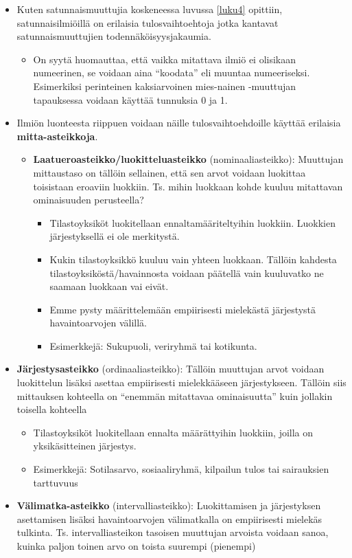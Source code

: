\documentclass[
]{book}
\providecommand{\tightlist}{%
  \setlength{\itemsep}{0pt}\setlength{\parskip}{0pt}}
\begin{document}
\begin{itemize}
\item
  Kuten satunnaismuuttujia koskeneessa luvussa \ref{luku4} opittiin, satunnaisilmiöillä on erilaisia tulosvaihtoehtoja jotka kantavat satunnaismuuttujien todennäköisyysjakaumia.

  \begin{itemize}
  \tightlist
  \item
    On syytä huomauttaa, että vaikka mitattava ilmiö ei olisikaan numeerinen, se voidaan aina ``koodata'' eli muuntaa numeeriseksi. Esimerkiksi perinteinen kaksiarvoinen mies-nainen -muuttujan tapauksessa voidaan käyttää tunnuksia 0 ja 1.
  \end{itemize}
\item
  Ilmiön luonteesta riippuen voidaan näille tulosvaihtoehdoille käyttää erilaisia \textbf{mitta-asteikkoja}.

  \begin{itemize}
  \tightlist
  \item
    \textbf{Laatueroasteikko/luokitteluasteikko} (nominaaliasteikko): Muuttujan mittaustaso on tällöin sellainen, että sen arvot voidaan luokittaa toisistaan eroaviin luokkiin. Ts. mihin luokkaan kohde kuuluu mitattavan ominaisuuden perusteella?

    \begin{itemize}
    \tightlist
    \item
      Tilastoyksiköt luokitellaan ennaltamääriteltyihin luokkiin. Luokkien järjestyksellä ei ole merkitystä.
    \item
      Kukin tilastoyksikkö kuuluu vain yhteen luokkaan. Tällöin kahdesta tilastoyksiköstä/havainnosta voidaan päätellä vain kuuluvatko ne saamaan luokkaan vai eivät.
    \item
      Emme pysty määrittelemään empiirisesti mielekästä järjestystä havaintoarvojen välillä.
    \item
      Esimerkkejä: Sukupuoli, veriryhmä tai kotikunta.
    \end{itemize}
  \end{itemize}
\item
  \textbf{Järjestysasteikko} (ordinaaliasteikko): Tällöin muuttujan arvot voidaan luokittelun lisäksi asettaa empiirisesti mielekkääseen järjestykseen. Tällöin siis mittauksen kohteella on ``enemmän mitattavaa ominaisuutta'' kuin jollakin toisella kohteella

  \begin{itemize}
  \tightlist
  \item
    Tilastoyksiköt luokitellaan ennalta määrättyihin luokkiin, joilla on yksikäsitteinen järjestys.
  \item
    Esimerkkejä: Sotilasarvo, sosiaaliryhmä, kilpailun tulos tai sairauksien tarttuvuus
  \end{itemize}
\item
  \textbf{Välimatka-asteikko} (intervalliasteikko): Luokittamisen ja järjestyksen asettamisen lisäksi havaintoarvojen välimatkalla on empiirisesti mielekäs tulkinta. Ts. intervalliasteikon tasoisen muuttujan arvoista voidaan sanoa, kuinka paljon toinen arvo on toista suurempi (pienempi)


\end{itemize}
\end{document}
